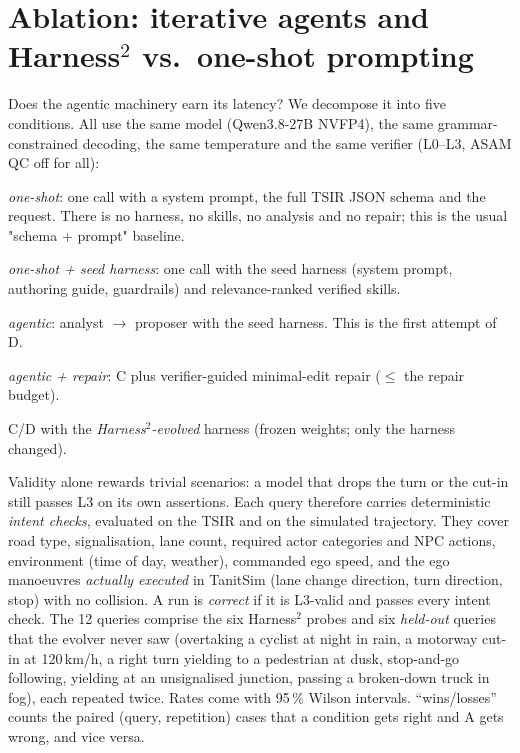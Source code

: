 \documentclass[10pt,a4paper]{article}
\begin{document}
\section{Ablation: iterative agents and Harness$^2$ vs.\ one-shot prompting}\label{sec:ablation}
Does the agentic machinery earn its latency? We decompose it into five conditions. All use the same model
(Qwen3.8-27B NVFP4), the same grammar-constrained decoding, the same temperature and the same verifier
(L0--L3, ASAM QC off for all):
\begin{description}[leftmargin=2.2em,style=sameline,itemsep=0pt]
\item[A] \emph{one-shot}: one call with a system prompt, the full TSIR JSON schema and the request. There is
  no harness, no skills, no analysis and no repair; this is the usual "schema + prompt" baseline.
\item[B] \emph{one-shot + seed harness}: one call with the seed harness (system prompt, authoring guide,
  guardrails) and relevance-ranked verified skills.
\item[C] \emph{agentic}: analyst $\to$ proposer with the seed harness. This is the first attempt of D.
\item[D] \emph{agentic + repair}: C plus verifier-guided minimal-edit repair ($\le$ the repair budget).
\item[E$_0$/E] C/D with the \emph{Harness$^2$-evolved} harness (frozen weights; only the harness changed).
\end{description}
Validity alone rewards trivial scenarios: a model that drops the turn or the cut-in still passes L3 on its
own assertions. Each query therefore carries deterministic \emph{intent checks}, evaluated on the TSIR and
on the simulated trajectory. They cover road type, signalisation, lane count, required actor categories
and NPC actions, environment (time of day, weather), commanded ego speed, and the ego manoeuvres
\emph{actually executed} in TanitSim (lane change direction, turn direction, stop) with no collision.
A run is \emph{correct} if it is L3-valid and passes every intent check. The 12 queries comprise the six
Harness$^2$ probes and six \emph{held-out} queries that the evolver never saw (overtaking a cyclist at
night in rain, a motorway cut-in at 120\,km/h, a right turn yielding to a pedestrian at dusk, stop-and-go
following, yielding at an unsignalised junction, passing a broken-down truck in fog), each repeated
twice. Rates come with 95\,\% Wilson intervals. ``wins/losses'' counts the paired (query, repetition)
cases that a condition gets right and A gets wrong, and vice versa.
\end{document}
